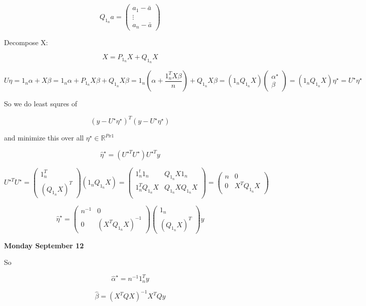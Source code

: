 \documentclass[11pt,fleqn]{book} %
\begin{document}
	$$ Q_{1_n} a = \begin{pmatrix}
		a_1 - \bar{a}\\
		\vdots \\
		a_n - \bar{a}

	\end{pmatrix}$$

	Decompose X:

	$$X = P_{1_n}X + Q_{1_n}X $$

	$$U \eta = 1_n \alpha + X\beta = 1_n \alpha + P_{1_n}X\beta + Q_{1_n}X\beta = 1_n (\alpha + \frac{1_n^T X\beta}{n}) + Q_{1_n}X\beta = (1_n Q_{1_n}X)\begin{pmatrix}
		\alpha^\star\\
		\beta
	\end{pmatrix} = (1_n Q_{1_n}X)\eta^\star = U^\star\eta^\star $$

	So we do least squres of

	$$(y - U^\star\eta^\star)^T(y - U^\star\eta^\star)$$

	and minimize this over all $\eta^\star \in \mathbb{R}^{Px1}$


	$$\hat{\eta}^\star = (U^{\star T} U^\star)U^{\star T} y $$

	$$U^{\star T} U^\star = \begin{pmatrix}
		1_n^T\\
		(Q_{1_n}X)^T
	\end{pmatrix} (1_n Q_{1_n}X) = \begin{pmatrix}
		1_n^t1_n & Q_{1_n}X1_n\\
		1_n^TQ_{1_n}X & Q_{1_n}X Q_{1_n}X\\
	\end{pmatrix}  = \begin{pmatrix}
		n & 0 \\
		0 & X^TQ_{1_n}X
	\end{pmatrix}$$

	$$\hat{\eta}^\star = \begin{pmatrix}
		n^{-1} & 0 \\
		0 & (X^T Q_{1_n}X)^{-1}
	\end{pmatrix} \begin{pmatrix}
		1_n \\
		(Q_{1_n}X)^T
	\end{pmatrix} y$$

	\textbf{Monday September 12}

	So 

	$$\hat{\alpha}^\star = n^{-1}1_n^T y $$

	$$\hat{\beta} = (X^TQX)^{-1} X^TQ y $$
\end{document}
